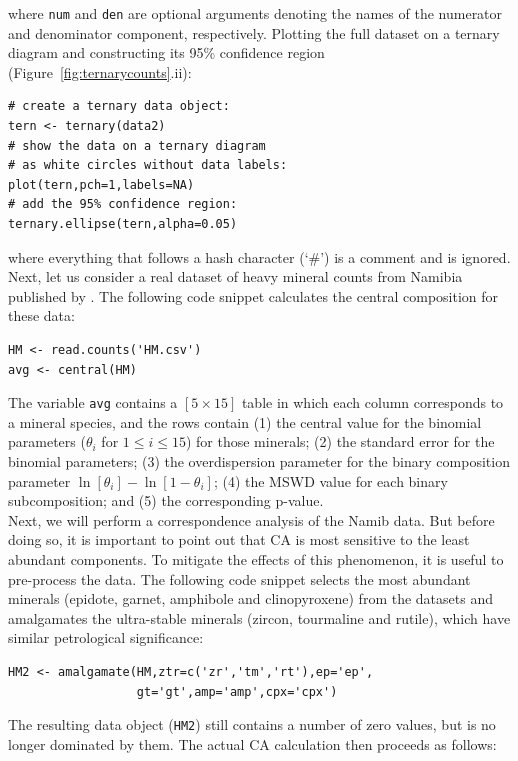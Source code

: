 \documentclass{article}
\begin{document}
\noindent where \texttt{num} and \texttt{den} are optional arguments
denoting the names of the numerator and denominator component,
respectively. Plotting the full dataset on a ternary diagram and
constructing its 95\% confidence region
(Figure~\ref{fig:ternarycounts}.ii):

\begin{verbatim}
# create a ternary data object:
tern <- ternary(data2)
# show the data on a ternary diagram
# as white circles without data labels:
plot(tern,pch=1,labels=NA)
# add the 95% confidence region:
ternary.ellipse(tern,alpha=0.05)
\end{verbatim}

\noindent where everything that follows a hash character (`\#') is a
comment and is ignored. Next, let us consider a real dataset of heavy
mineral counts from Namibia published by \citet{vermeesch2016a}.  The
following code snippet calculates the central composition for these
data:

\begin{verbatim}
HM <- read.counts('HM.csv')
avg <- central(HM)
\end{verbatim}

The variable \texttt{avg} contains a $[5 \times 15]$ table in which
each column corresponds to a mineral species, and the rows contain (1)
the central value for the binomial parameters ($\theta_i$ for $1 \leq
i \leq 15$) for those minerals; (2) the standard error for the
binomial parameters; (3) the overdispersion parameter for the binary
composition parameter $\ln[\theta_i]-\ln[1-\theta_i]$; (4) the MSWD
value for each binary subcomposition; and (5) the corresponding
p-value.\\

Next, we will perform a correspondence analysis of the Namib data.
But before doing so, it is important to point out that CA is most
sensitive to the least abundant components.  To mitigate the effects
of this phenomenon, it is useful to pre-process the data. The
following code snippet selects the most abundant minerals (epidote,
garnet, amphibole and clinopyroxene) from the datasets and amalgamates
the ultra-stable minerals (zircon, tourmaline and rutile), which have
similar petrological significance:

\begin{verbatim}
HM2 <- amalgamate(HM,ztr=c('zr','tm','rt'),ep='ep',
                  gt='gt',amp='amp',cpx='cpx')
\end{verbatim}

The resulting data object (\texttt{HM2}) still contains a number
of zero values, but is no longer dominated by them. The actual
CA calculation then proceeds as follows:
\end{document}
